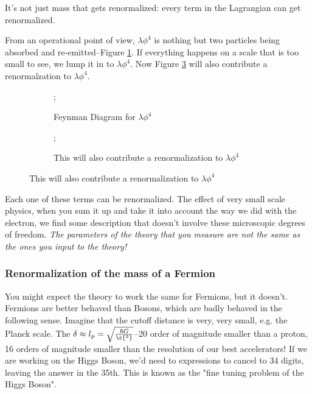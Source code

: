 \documentclass[]{article}
\begin{document}
It's not just mass that gets renormalized: every term in the Lagrangian can get renormalized.

From an operational point of view, $\lambda \phi^4$ is nothing but two particles being absorbed and re-emitted--Figure \ref{fig:lambda:phi:4}. If everything happens on a scale that is too small to see, we lump it in to $\lambda \phi^4$. Now Figure \ref{fig:lambda:phi:4x} will also contribute a renormalzation to $\lambda \phi^4$.

\begin{figure}[H]
	\begin{center}
		\caption{Renormalization of $\lambda \phi^4$}
		\begin{subfigure}[t]{0.45\textwidth}
			\caption{Feynman Diagram for $\lambda \phi^4$}\label{fig:lambda:phi:4}
			;
		\end{subfigure}
		\begin{subfigure}[t]{0.45\textwidth}
			\caption{This will also contribute a renormalization to $\lambda \phi^4$}\label{fig:lambda:phi:4x}
			;
		\end{subfigure}
	\end{center}
\end{figure}

Each one of these terms can be renormalized. The effect of very small scale physics, when you sum it up and take it into account the way we did with the electron, we find some description that doesn't involve these microscopic degrees of freedom. \emph{The parameters of the theory that you measure are not the same as the ones you input to the theory!}

\subsubsection{Renormalization of the mass of a Fermion}

You might expect the theory to work the same for Fermions, but it doesn't. Fermions are better behaved than Bosons, which are badly behaved in the following sense. Imagine that the cutoff distance is very, very small, e.g. the Planck scale. The $\delta \approx l_p = \sqrt{\frac{\hslash G}{\c{^3}}}$--20 order of magnitude smaller than a proton, 16 orders of magnitude smaller than the resolution of our best accelerators! If we are working on the Higgs Boson, we'd need to expressions to cancel to 34 digits, leaving the answer in the 35th. This is known as the "fine tuning problem of the Higgs Boson".
\end{document}
